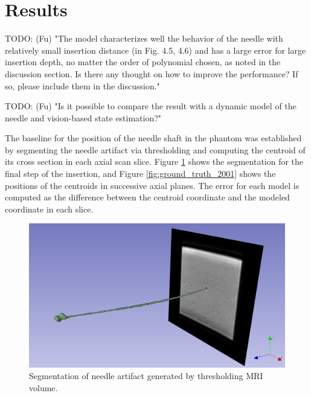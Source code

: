 \section{Results}

TODO: (Fu) "The model characterizes well the behavior of the needle with relatively small insertion distance (in Fig. 4.5, 4.6) and has a large error for large insertion depth, no matter the order of polynomial chosen, as noted in the discussion section. Is there any thought on how to improve the performance? If so, please include them in the discussion."

TODO: (Fu) "Is it possible to compare the result with a dynamic model of the needle and vision-based state estimation?"

The baseline for the position of the needle shaft in the phantom was established by segmenting the needle artifact via thresholding and computing the centroid of its cross section in each axial scan slice. Figure \ref{fig:seg_2001} shows the segmentation for the final step of the insertion, and Figure \ref{fig:ground_truth_2001} shows the positions of the centroids in successive axial planes. The error for each model is computed as the difference between the centroid coordinate and the modeled coordinate in each slice.

\begin{figure}[h]
\includegraphics[width=1.0\textwidth]{Fig/chap5/segmented_artifact_2001.png}
\caption{Segmentation of needle artifact generated by thresholding MRI volume.}
\label{fig:seg_2001}
\end{figure}

